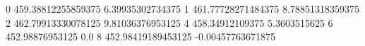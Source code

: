 0 459.38812255859375 6.39935302734375
1 461.77728271484375 8.78851318359375
2 462.79913330078125 9.81036376953125
4 458.34912109375 5.3603515625
6 452.98876953125 0.0
8 452.98419189453125 -0.00457763671875
